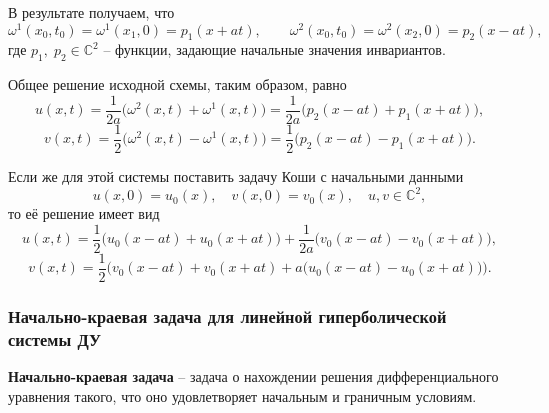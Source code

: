 \documentclass[../main.tex]{subfile}
\begin{document}
\begin{example}
	
	
	В результате получаем, что
	\[\omega^1(x_0,t_0)=\omega^1(x_1,0)=p_1(x+at),\qquad
	  \omega^2(x_0,t_0)=\omega^2(x_2,0)=p_2(x-at),\]
	где $p_1,\;p_2\in \mathbb C^2$ -- функции, задающие начальные значения
	инвариантов.
	
	Общее решение исходной схемы, таким образом, равно
	\[u(x,t)=\frac{1}{2a}\big(\omega^2(x,t)+\omega^1(x,t)\big)=
	\frac{1}{2a}\big(p_2(x-at)+p_1(x+at)\big),\]
	\[v(x,t)=\frac{1}{2}\big(\omega^2(x,t)-\omega^1(x,t)\big)=
	\frac{1}{2}\big(p_2(x-at)-p_1(x+at)\big).\]
	
	Если же для этой системы поставить задачу Коши с начальными данными
	\[u(x,0)=u_0(x),\quad v(x,0)=v_0(x),\quad u,v\in\mathbb C^2,\]
	то её решение имеет вид
	\[u(x,t)=\frac{1}{2}\big(u_0(x-at)+u_0(x+at)\big)+
	\frac{1}{2a}\big(v_0(x-at)-v_0(x+at)\big),\]
	\[v(x,t)=\frac{1}{2}\Big(v_0(x-at)+v_0(x+at)+
	a\big(u_0(x-at)-u_0(x+at)\big)\Big).\]
\end{example}

\subsubsection{Начально-краевая задача для линейной гиперболической системы ДУ}

\begin{define}
	\textbf{Начально-краевая задача} -- задача о нахождении решения
	дифференциального уравнения такого, что оно удовлетворяет начальным
	и граничным условиям.
\end{define}
\end{document}
